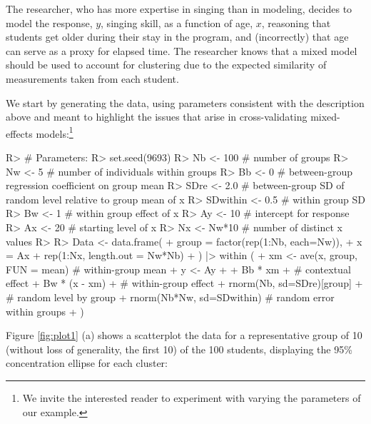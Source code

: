 \documentclass[
]{jss}
\begin{document}
The researcher, who has more expertise in singing than in modeling,
decides to model the response, \(y\), singing skill, as a function of
age, \(x\), reasoning that students get older during their stay in the
program, and (incorrectly) that age can serve as a proxy for elapsed
time. The researcher knows that a mixed model should be used to account
for clustering due to the expected similarity of measurements taken from
each student.

We start by generating the data, using parameters consistent with the
description above and meant to highlight the issues that arise in
cross-validating mixed-effects models:\footnote{We invite the interested
  reader to experiment with varying the parameters of our example.}

\begin{CodeChunk}
\begin{CodeInput}
R> # Parameters:
R> set.seed(9693) 
R> Nb <- 100     # number of groups
R> Nw <- 5       # number of individuals within groups
R> Bb <- 0       # between-group regression coefficient on group mean
R> SDre <- 2.0   # between-group SD of random level relative to group mean of x
R> SDwithin <- 0.5  # within group SD
R> Bw <- 1          # within group effect of x
R> Ay <- 10         # intercept for response
R> Ax <- 20         # starting level of x
R> Nx <- Nw*10      # number of distinct x values
R> 
R> Data <- data.frame(
+   group = factor(rep(1:Nb, each=Nw)),
+   x = Ax + rep(1:Nx, length.out = Nw*Nb)
+ ) |> within ({
+   xm  <- ave(x, group, FUN = mean) # within-group mean
+   y <- Ay +
+     Bb * xm +                    # contextual effect
+     Bw * (x - xm) +              # within-group effect
+     rnorm(Nb, sd=SDre)[group] +  # random level by group
+     rnorm(Nb*Nw, sd=SDwithin)    # random error within groups
+ })
\end{CodeInput}
\end{CodeChunk}

Figure \ref{fig:plot1} (a) shows a scatterplot the data for a
representative group of 10 (without loss of generality, the first 10) of
the 100 students, displaying the 95\% concentration ellipse for each
cluster:
\end{document}

